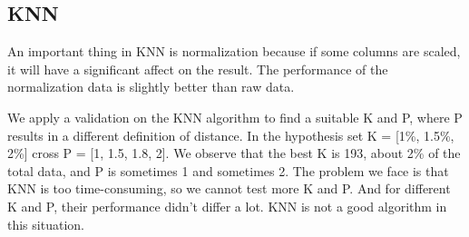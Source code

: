 \subsection*{KNN}

An important thing in KNN is normalization because if some columns are scaled, it will have a significant affect on the result. The performance of the normalization data is slightly better than raw data.

We apply a validation on the KNN algorithm to find a suitable K and P, where P results in a different definition of distance. In the hypothesis set K = [1\%, 1.5\%, 2\%] cross P = [1, 1.5, 1.8, 2]. We observe that the best K is 193, about 2\% of the total data, and P is sometimes 1 and sometimes 2. The problem we face is that KNN is too time-consuming, so we cannot test more K and P. And for different K and P, their performance didn't differ a lot. KNN is not a good algorithm in this situation.